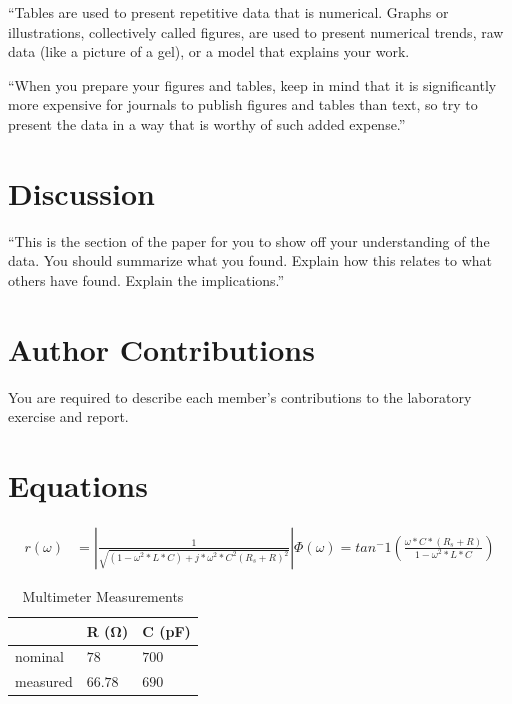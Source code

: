 \documentclass[10pt,twocolumn]{article}
\begin{document}
``Tables are used to present repetitive data that is numerical. Graphs or illustrations, collectively called figures, are used to present numerical trends, raw data (like a picture of a gel), or a model that explains your work.

``When you prepare your figures and tables, keep in mind that it is significantly more expensive for journals to publish figures and tables than text, so try to present the data in a way that is worthy of such added expense.''

\section{Discussion}

``This is the section of the paper for you to show off your understanding of the data. You should summarize what you found. Explain how this relates to what others have found. Explain the implications.''

\section{Author Contributions}

You are required to describe each member's contributions to the laboratory exercise and report.

\section{Equations}

\begin{align*}
	
	 r(\omega) &= |\frac{1}{\sqrt{\left(1 - \omega^2*L*C\right) + j*\omega^2*C^2\left(R_{s}+R\right)^2}}|
	 
	 \Phi(\omega) = tan^-1(\frac{\omega*C*\left(R_{s}+R\right)}{1-\omega^2*L*C})
\end{align*}

\begin{table}[bt]
	\begin{tabularx}{1\linewidth}{ lXX }
		\hline
		 & \textbf{R (Ω)} & \textbf{C (pF)} \\
		\hline
		nominal & $78$ & $700$ \\
		measured & $66.78$ & $690$ \\
		\hline
	\end{tabularx}
	\caption{Multimeter Measurements}
	\label{tab:Tab1}
\end{table}
\end{document}
